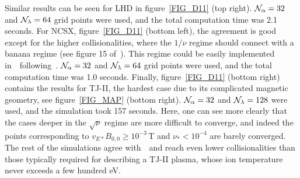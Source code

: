 Similar results can be seen for LHD in figure~\ref{FIG_D11} (top right). ${\cal{N}}_\alpha=32$  and ${\cal{N}}_\lambda=64$ grid points were used, and the total computation time was 2.1 seconds. For NCSX,  figure~\ref{FIG_D11} (bottom left), the agreement is good except for the higher collisionalities, where the $1/\nu$ regime should connect with a banana regime (see figure 15 of~\citep{beidler2011icnts}). This regime could be easily implemented in~\KNOSOS~following~\citep{landreman2012omni}. ${\cal{N}}_\alpha=32$  and ${\cal{N}}_\lambda=64$ grid points were used, and the total computation time was 1.0 seconds. Finally, figure~\ref{FIG_D11} (bottom right) contains the results for TJ-II, the hardest case due to its complicated magnetic geometry, see figure~\ref{FIG_MAP} (bottom right). ${\cal{N}}_\alpha=32$  and ${\cal{N}}_\lambda=128$ were used, and the simulation took 157 seconds.  Here, one can see more clearly that the cases deeper in the $\sqrt{\nu}$ regime are more difficult to converge, and indeed the points corresponding to $v_{E*}B_{0,0} \geq 10^{-3}\,$T and $\nu_*< 10^{-4}$ are barely converged. The rest of the simulations agree with~\DKES~and reach even lower collisionalities than those typically required for describing a TJ-II plasma, whose ion temperature never exceeds a few hundred eV.
 


